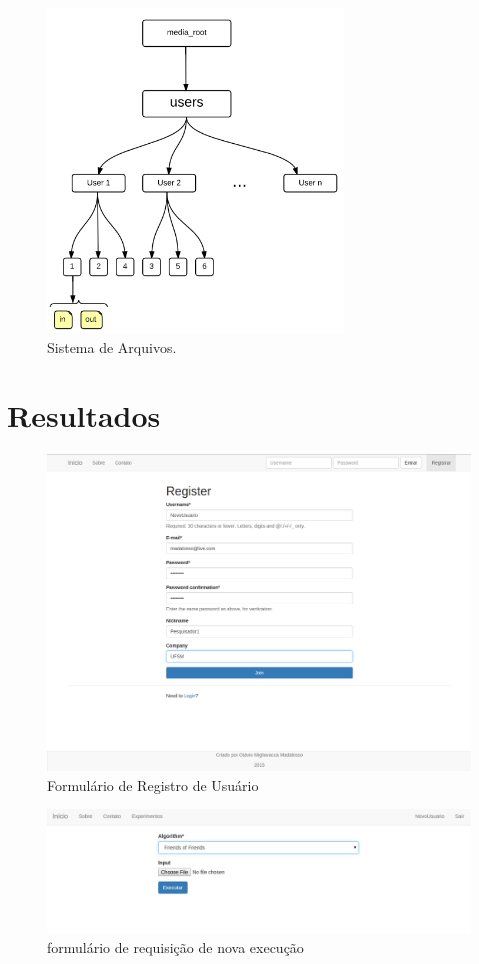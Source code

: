 \documentclass[tg]{mdtufsm}
\begin{document}
\begin{figure}
	\centering
	\includegraphics[width=0.7\textwidth]{filesystem}
	\caption{
		Sistema de Arquivos.
	}
	\label{fig:filesystem}
\end{figure}

\chapter{Resultados}
\begin{figure}
	\centering
	\includegraphics[width=1\textwidth]{res1}
	\caption{
		Formulário de Registro de Usuário
	}
	\label{fig:res1}
\end{figure}
\begin{figure}
	\centering
	\includegraphics[width=1\textwidth]{res3}
	\caption{
		formulário de requisição de nova execução
	}
	\label{fig:res3}
\end{figure}
\end{document}
